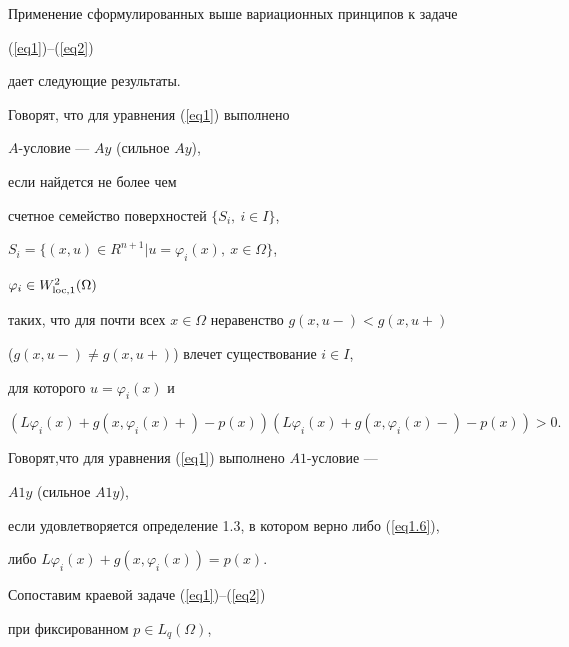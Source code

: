 Применение сформулированных выше вариационных принципов к задаче


(\ref{eq1})--(\ref{eq2})


дает следующие результаты.





\begin{defns}


Говорят, что для уравнения (\ref{eq1}) выполнено


$A$-условие --- $Ay$ \cite{n18} (сильное $Ay$),


если найдется не более чем


счетное семейство поверхностей $\{S_{i},\ i\in I\}$,


$S_i = \{(x,u)\in R^{n+1} | u= \varphi_i(x),\ x \in \Omega \}$,


$\varphi_i \in W_{\operatorname{loc},1}^{2} (\Omega)$


таких, что для почти всех $x\in \Omega$ неравенство $g(x,u-)<g(x,u+)$


($g(x,u-)\ne g(x,u+)$) влечет существование $i\in I$,


для которого $u=\varphi_{i}(x)$ и


\begin{equation}


(L\varphi_i(x)+g(x,\varphi_i(x)+)-p(x)) (L\varphi_i(x)+g(x,


\varphi_i(x)-)-p(x))>0. \label{eq1.6}


\end{equation}


\end{defns}





\begin{defns}


Говорят,что для уравнения (\ref{eq1}) выполнено $A1$-условие ---


$A1y$ (сильное $A1y$),


если удовлетворяется определение 1.3, в котором верно либо (\ref{eq1.6}),


либо $L\varphi_i(x)+g(x,\varphi_i(x))=p(x)$.


\end{defns}





Сопоставим краевой задаче (\ref{eq1})--(\ref{eq2})


при фиксированном $p\in L_q(\Omega)$,


